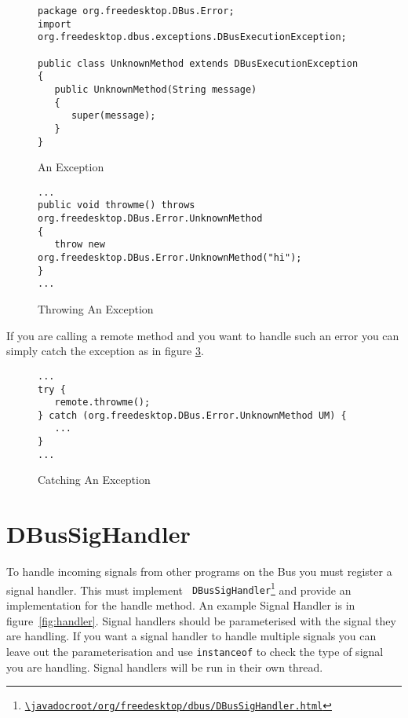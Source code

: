 \documentclass[a4paper,12pt]{article}
\begin{document}
\begin{figure}[htb]
\begin{center}
\begin{verbatim}
package org.freedesktop.DBus.Error;
import org.freedesktop.dbus.exceptions.DBusExecutionException;

public class UnknownMethod extends DBusExecutionException
{
   public UnknownMethod(String message)
   {
      super(message);
   }
}
\end{verbatim}
\end{center}
\caption{An Exception}
\label{fig:exceptiondef}
\end{figure}

\begin{figure}[htb]
\begin{center}
\begin{verbatim}
...
public void throwme() throws org.freedesktop.DBus.Error.UnknownMethod
{
   throw new org.freedesktop.DBus.Error.UnknownMethod("hi");
}
...
\end{verbatim}
\end{center}
\caption{Throwing An Exception}
\label{fig:exceptioncall}
\end{figure}

If you are calling a remote method and you want to handle such an error you can
simply catch the exception as in figure \ref{fig:exceptioncatch}. 

\begin{figure}[htb]
\begin{center}
\begin{verbatim}
...
try {
   remote.throwme();
} catch (org.freedesktop.DBus.Error.UnknownMethod UM) {
   ...
}
...
\end{verbatim}
\end{center}
\caption{Catching An Exception}
\label{fig:exceptioncatch}
\end{figure}

\section{DBusSigHandler}

To handle incoming signals from other programs on the Bus you must register a
signal handler. This must implement {\tt
DBusSigHandler\footnote{\url{\javadocroot/org/freedesktop/dbus/DBusSigHandler.html}}}
and provide an implementation for the handle method. An example Signal Handler
is in figure~\ref{fig:handler}. Signal handlers should be parameterised with
the signal they are handling. If you want a signal handler to handle multiple
signals you can leave out the parameterisation and use {\tt instanceof} to
check the type of signal you are handling. Signal handlers will be run in their
own thread.
\end{document}
